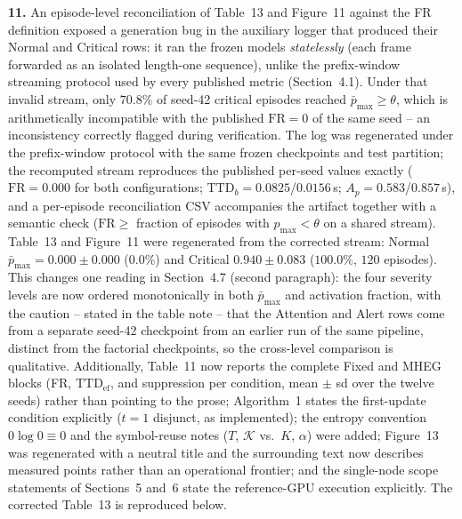 \documentclass[1p,12pt,authoryear]{elsarticle}
\begin{document}
\vspace{2mm}
\noindent \textbf{11.} An episode-level reconciliation of Table~13 and Figure~11 against the FR definition exposed a generation bug in the auxiliary logger that produced their Normal and Critical rows: it ran the frozen models \emph{statelessly} (each frame forwarded as an isolated length-one sequence), unlike the prefix-window streaming protocol used by every published metric (Section~4.1). Under that invalid stream, only $70.8\%$ of seed-42 critical episodes reached $\bar{p}_{\max} \ge \theta$, which is arithmetically incompatible with the published $\mathrm{FR}=0$ of the same seed -- an inconsistency correctly flagged during verification. The log was regenerated under the prefix-window protocol with the same frozen checkpoints and test partition; the recomputed stream reproduces the published per-seed values exactly ($\mathrm{FR}=0.000$ for both configurations; $\mathrm{TTD}_b = 0.0825$/$0.0156$\,s; $A_p = 0.583$/$0.857$\,s), and a per-episode reconciliation CSV accompanies the artifact together with a semantic check ($\mathrm{FR} \ge$ fraction of episodes with $p_{\max} < \theta$ on a shared stream). Table~13 and Figure~11 were regenerated from the corrected stream: Normal $\bar{p}_{\max} = 0.000 \pm 0.000$ ($0.0\%$) and Critical $0.940 \pm 0.083$ ($100.0\%$, $120$ episodes). This changes one reading in Section~4.7 (second paragraph): the four severity levels are now ordered monotonically in both $\bar{p}_{\max}$ and activation fraction, with the caution -- stated in the table note -- that the Attention and Alert rows come from a separate seed-42 checkpoint from an earlier run of the same pipeline, distinct from the factorial checkpoints, so the cross-level comparison is qualitative. Additionally, Table~11 now reports the complete Fixed and MHEG blocks (FR, $\mathrm{TTD}_{\mathrm{ef}}$, and suppression per condition, mean $\pm$ sd over the twelve seeds) rather than pointing to the prose; Algorithm~1 states the first-update condition explicitly ($t{=}1$ disjunct, as implemented); the entropy convention $0\log 0 \equiv 0$ and the symbol-reuse notes ($T$, $\mathcal{K}$ vs.\ $K$, $\alpha$) were added; Figure~13 was regenerated with a neutral title and the surrounding text now describes measured points rather than an operational frontier; and the single-node scope statements of Sections~5 and~6 state the reference-GPU execution explicitly. The corrected Table~13 is reproduced below.
\end{document}
